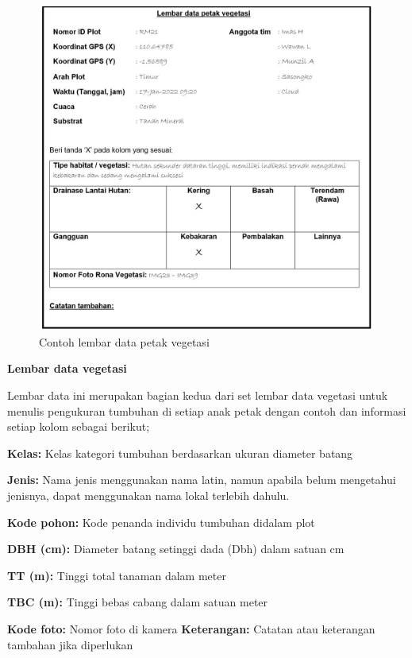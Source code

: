 \documentclass[
  oneside]{book}
\begin{document}
\begin{figure}

{\centering \includegraphics[width=1\linewidth]{images/ldv_ip} 

}

\caption{Contoh lembar data petak vegetasi}\label{fig:ldvip}
\end{figure}

\textbf{Lembar data vegetasi}

Lembar data ini merupakan bagian kedua dari set lembar data vegetasi untuk menulis pengukuran tumbuhan di setiap anak petak dengan contoh dan informasi setiap kolom sebagai berikut;

\textbf{Kelas:} Kelas kategori tumbuhan berdasarkan ukuran diameter batang

\textbf{Jenis:} Nama jenis menggunakan nama latin, namun apabila belum mengetahui jenisnya, dapat menggunakan nama lokal terlebih dahulu.

\textbf{Kode pohon:} Kode penanda individu tumbuhan didalam plot

\textbf{DBH (cm):} Diameter batang setinggi dada (Dbh) dalam satuan cm

\textbf{TT (m):} Tinggi total tanaman dalam meter

\textbf{TBC (m):} Tinggi bebas cabang dalam satuan meter

\textbf{Kode foto:} Nomor foto di kamera
\textbf{Keterangan:} Catatan atau keterangan tambahan jika diperlukan
\end{document}
